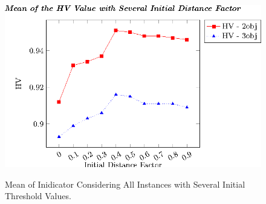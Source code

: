 %
%
%
%
%
%
%
%
%
%
\begin{figure}[t]
\centering
\includegraphics[]{Images/Graphic-Initial-Distance_tikz-figure0.eps} \\
%
\caption{Mean of Inidicator Considering All Instances with Several Initial Threshold Values.}\label{fig:Initial-distance-factor}
\end{figure}





%
%


%
%

